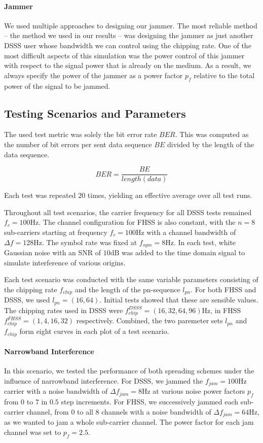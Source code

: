 	\paragraph{Jammer}
	We used multiple approaches to designing our jammer. The most reliable method -- the method we used in our results -- was designing the jammer as just another DSSS user whose bandwidth we can control using the chipping rate. One of the most difficult aspects of this simulation was the power control of this jammer with respect to the signal power that is already on the medium. As a result, we always specify the power of the jammer as a power factor $p_f$ relative to the total power of the signal to be jammed.
	
	\subsection{Testing Scenarios and Parameters}
	The used test metric was solely the bit error rate $BER$. This was computed as the number of bit errors per sent data sequence $BE$ divided by the length of the data sequence.
	
	\[
		BER = \frac{BE}{length(data)}
	\]
	
	Each test was repeated $20$ times, yielding an effective average over all test runs.
	
	Throughout all test scenarios, the carrier frequency for all DSSS tests remained $f_c = 100\text{Hz}$. The channel configuration for FHSS is also constant, with the $n=8$ sub-carriers starting at frequency $f_c = 100\text{Hz}$ with a channel bandwidth of $\Delta f = 128 \text{Hz}$. The symbol rate was fixed at $f_{sym} = 8\text{Hz}$. In each test, white Gaussian noise with an SNR of $10\text{dB}$ was added to the time domain signal to simulate interference of various origins.
	
	Each test scenario was conducted with the same variable parameters consisting of the chipping rate $f_{chip}$ and the length of the pn-sequence $l_{pn}$. For both FHSS and DSSS, we used $l_{pn} = (16, 64)$. Initial tests showed that these are sensible values. The chipping rates used in DSSS were $f_{chip}^{DSSS} = (16,32,64,96)\text{Hz}$, in FHSS $f_{chip}^{FHSS} = (1, 4, 16, 32)$ respectively. Combined, the two paremeter sets $l_{pn}$ and $f_{chip}$ form eight curves in each plot of a test scenario.
	
	\paragraph{Narrowband Interference}
	In this scenario, we tested the performance of both spreading schemes under the influence of narrowband interference. For DSSS, we jammed the $f_{jam} = 100\text{Hz}$ carrier with a noise bandwidth of $\Delta f_{jam} = 8\text{Hz}$ at various noise power factors $p_f$ from $0$ to $7$ in $0.5$ step increments. For FHSS, we successively jammed each sub-carrier channel, from $0$ to all $8$ channels with a noise bandwidth of $\Delta f_{jam} = 64\text{Hz}$, as we wanted to jam a whole sub-carrier channel. The power factor for each jam channel was set to $p_f = 2.5$.
	
